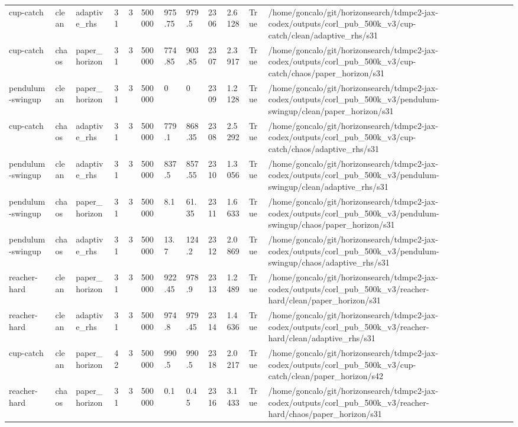 \begin{tabular}{llllllllllll}
cup-catch & clean & adaptive\_rhs & 31 & 3 & 500000 & 975.75 & 979.5 & 2306 & 2.6128 & True & /home/goncalo/git/horizonsearch/tdmpc2-jax-codex/outputs/corl\_pub\_500k\_v3/cup-catch/clean/adaptive\_rhs/s31 \\
cup-catch & chaos & paper\_horizon & 31 & 3 & 500000 & 774.85 & 903.85 & 2307 & 2.3917 & True & /home/goncalo/git/horizonsearch/tdmpc2-jax-codex/outputs/corl\_pub\_500k\_v3/cup-catch/chaos/paper\_horizon/s31 \\
pendulum-swingup & clean & paper\_horizon & 31 & 3 & 500000 & 0 & 0 & 2309 & 1.2128 & True & /home/goncalo/git/horizonsearch/tdmpc2-jax-codex/outputs/corl\_pub\_500k\_v3/pendulum-swingup/clean/paper\_horizon/s31 \\
cup-catch & chaos & adaptive\_rhs & 31 & 3 & 500000 & 779.1 & 868.35 & 2308 & 2.5292 & True & /home/goncalo/git/horizonsearch/tdmpc2-jax-codex/outputs/corl\_pub\_500k\_v3/cup-catch/chaos/adaptive\_rhs/s31 \\
pendulum-swingup & clean & adaptive\_rhs & 31 & 3 & 500000 & 837.5 & 857.55 & 2310 & 1.3056 & True & /home/goncalo/git/horizonsearch/tdmpc2-jax-codex/outputs/corl\_pub\_500k\_v3/pendulum-swingup/clean/adaptive\_rhs/s31 \\
pendulum-swingup & chaos & paper\_horizon & 31 & 3 & 500000 & 8.1 & 61.35 & 2311 & 1.6633 & True & /home/goncalo/git/horizonsearch/tdmpc2-jax-codex/outputs/corl\_pub\_500k\_v3/pendulum-swingup/chaos/paper\_horizon/s31 \\
pendulum-swingup & chaos & adaptive\_rhs & 31 & 3 & 500000 & 13.7 & 124.2 & 2312 & 2.0869 & True & /home/goncalo/git/horizonsearch/tdmpc2-jax-codex/outputs/corl\_pub\_500k\_v3/pendulum-swingup/chaos/adaptive\_rhs/s31 \\
reacher-hard & clean & paper\_horizon & 31 & 3 & 500000 & 922.45 & 978.9 & 2313 & 1.2489 & True & /home/goncalo/git/horizonsearch/tdmpc2-jax-codex/outputs/corl\_pub\_500k\_v3/reacher-hard/clean/paper\_horizon/s31 \\
reacher-hard & clean & adaptive\_rhs & 31 & 3 & 500000 & 974.8 & 979.45 & 2314 & 1.4636 & True & /home/goncalo/git/horizonsearch/tdmpc2-jax-codex/outputs/corl\_pub\_500k\_v3/reacher-hard/clean/adaptive\_rhs/s31 \\
cup-catch & clean & paper\_horizon & 42 & 3 & 500000 & 990.5 & 990.5 & 2318 & 2.0217 & True & /home/goncalo/git/horizonsearch/tdmpc2-jax-codex/outputs/corl\_pub\_500k\_v3/cup-catch/clean/paper\_horizon/s42 \\
reacher-hard & chaos & paper\_horizon & 31 & 3 & 500000 & 0.1 & 0.45 & 2316 & 3.1433 & True & /home/goncalo/git/horizonsearch/tdmpc2-jax-codex/outputs/corl\_pub\_500k\_v3/reacher-hard/chaos/paper\_horizon/s31 \\

\end{tabular}
